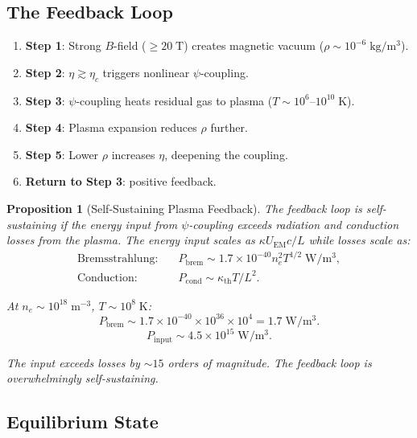\documentclass[11pt,a4paper]{article}
\newtheorem{proposition}{Proposition}
\begin{document}
\subsection{The Feedback Loop}

\begin{enumerate}
\item \textbf{Step 1}: Strong $B$-field ($\geq 20\;\mathrm{T}$) creates magnetic vacuum
($\rho \sim 10^{-6}\;\mathrm{kg/m^3}$).
\item \textbf{Step 2}: $\eta \gtrsim \eta_c$ triggers nonlinear $\psi$-coupling.
\item \textbf{Step 3}: $\psi$-coupling heats residual gas to plasma ($T \sim 10^6$--$10^{10}\;\mathrm{K}$).
\item \textbf{Step 4}: Plasma expansion reduces $\rho$ further.
\item \textbf{Step 5}: Lower $\rho$ increases $\eta$, deepening the coupling.
\item \textbf{Return to Step 3}: positive feedback.
\end{enumerate}

\begin{proposition}[Self-Sustaining Plasma Feedback]\label{prop:feedback}
The feedback loop is self-sustaining if the energy input from $\psi$-coupling exceeds
radiation and conduction losses from the plasma. The energy input scales as $\kappa U_{\mathrm{EM}} c/L$
while losses scale as:
\begin{align}
\text{Bremsstrahlung:} &\quad P_{\mathrm{brem}} \sim 1.7 \times 10^{-40} n_e^2 T^{1/2}\;\mathrm{W/m^3}, \\
\text{Conduction:} &\quad P_{\mathrm{cond}} \sim \kappa_{\mathrm{th}} T / L^2.
\end{align}

At $n_e \sim 10^{18}\;\mathrm{m^{-3}}$, $T \sim 10^8\;\mathrm{K}$:
\begin{equation}
P_{\mathrm{brem}} \sim 1.7 \times 10^{-40} \times 10^{36} \times 10^4
= 1.7\;\mathrm{W/m^3}.
\end{equation}
\begin{equation}
P_{\mathrm{input}} \sim 4.5 \times 10^{15}\;\mathrm{W/m^3}.
\end{equation}

The input exceeds losses by $\sim 15$ orders of magnitude. The feedback loop is
overwhelmingly self-sustaining.
\end{proposition}

\subsection{Equilibrium State}
\end{document}
